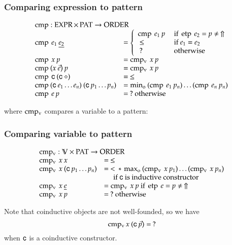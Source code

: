 \subsubsection{Comparing expression to pattern}
\[
\begin{array}[t]{ll}
\multicolumn{2}{l}{\cmp : \Expr \times \Pat \ra \order}\\ 
\cmp \: e_1 \: \inacc{e_2} & = \left\{ 
\begin{array}{ll}
\cmp \: e_1 \: p & \mbox{ if } \etp \: e_2 = p \neq \: \stuck \\
\: \leq \: & \mbox{ if } e_1 = e_2 \\
\: ? \:    & \mbox{ otherwise}
\end{array}\right.\\ 
\cmp \: x \: p & = \cmpv \: x \:p  \\
\cmp \: (x \: \vec{e}) \: p & = \cmpv \: x \:p  \\
\cmp \: \cc   \: (\cc \: \diamond) & = \: \leq \\
\cmp \: (\cc \: e_1 \ldots e_n) \: (\cc \: p_1 \ldots p_n) & = \info \: (\cmp \: e_1 \: p_n) \ldots (\cmp \: e_n \: p_n)\\

\cmp \: e \: p & = \: ? \mbox{ otherwise}
\end{array}
\]

where $\operatorname{cmp_v}$ compares a variable to a pattern:

\subsubsection{Comparing variable to pattern}
\[
\begin{array}[t]{ll}
\multicolumn{2}{l}{\cmpv : \cV \times \Pat \ra \order}\\ 
\cmpv \: x \: x & = \: \leq \\
\cmpv \: x \: (\cc \: p_1 \ldots p_n) & = \: < \: * \: \supo \: (\cmpv \: x \: p_1) \ldots (\cmpv \: x \: p_n) \\
& \spc \: \mbox{ if } \cc \mbox{ is inductive constructor}\\
\cmpv \: x \: \inacc{e} & = \cmpv \: x \: p \mbox{ if } \etp \: e = p \neq \: \stuck \\
\cmpv \: x \: p & = \: ? \mbox{ otherwise}
\end{array}
\]


\noindent Note that coinductive objects are not well-founded, so we have 
\[\operatorname{cmp_v} x \: (\mathsf{c} \: \vec{p}) = \: ? \]
when $\mathsf{c}$ is a coinductive constructor. 

